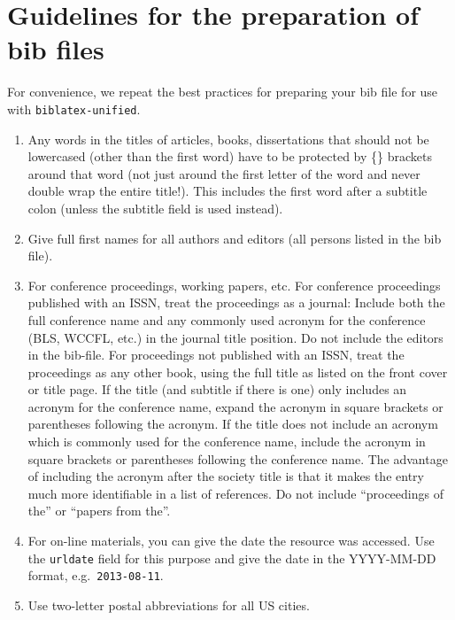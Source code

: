 \documentclass[
]{article}
\providecommand{\tightlist}{%
  \setlength{\itemsep}{0pt}\setlength{\parskip}{0pt}}
\begin{document}
\hypertarget{guidelines-for-the-preparation-of-bib-files}{%
\section{Guidelines for the preparation of bib
files}\label{guidelines-for-the-preparation-of-bib-files}}

For convenience, we repeat the best practices for preparing your bib
file for use with \texttt{biblatex-unified}.

\begin{enumerate}
\def\labelenumi{\arabic{enumi}.}
\tightlist
\item
  Any words in the titles of articles, books, dissertations that should
  not be lowercased (other than the first word) have to be protected by
  \{\} brackets around that word (not just around the first letter of
  the word and never double wrap the entire title!). This includes the
  first word after a subtitle colon (unless the subtitle field is used
  instead).
\item
  Give full first names for all authors and editors (all persons listed
  in the bib file).
\item
  For conference proceedings, working papers, etc. For conference
  proceedings published with an ISSN, treat the proceedings as a
  journal: Include both the full conference name and any commonly used
  acronym for the conference (BLS, WCCFL, etc.) in the journal title
  position. Do not include the editors in the bib-file. For proceedings
  not published with an ISSN, treat the proceedings as any other book,
  using the full title as listed on the front cover or title page. If
  the title (and subtitle if there is one) only includes an acronym for
  the conference name, expand the acronym in square brackets or
  parentheses following the acronym. If the title does not include an
  acronym which is commonly used for the conference name, include the
  acronym in square brackets or parentheses following the conference
  name. The advantage of including the acronym after the society title
  is that it makes the entry much more identifiable in a list of
  references. Do not include ``proceedings of the'' or ``papers from
  the''.
\item
  For on-line materials, you can give the date the resource was
  accessed. Use the \texttt{urldate} field for this purpose and give the
  date in the YYYY-MM-DD format, e.g.~\texttt{2013-08-11}.
\item
  Use two-letter postal abbreviations for all US cities.
\end{enumerate}
\end{document}
